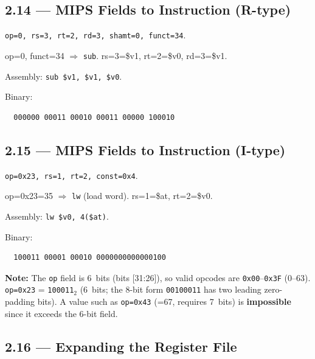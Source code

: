 \subsection*{2.14 --- MIPS Fields to Instruction (R-type)}
\hypertarget{sol-2.14}{}

\texttt{op=0, rs=3, rt=2, rd=3, shamt=0, funct=34}.

op=0, funct=34 $\Rightarrow$ \texttt{sub}.
rs=3=\$v1, rt=2=\$v0, rd=3=\$v1.

Assembly: \texttt{sub \$v1, \$v1, \$v0}.

Binary:
\begin{verbatim}
  000000 00011 00010 00011 00000 100010
\end{verbatim}

\subsection*{2.15 --- MIPS Fields to Instruction (I-type)}
\hypertarget{sol-2.15}{}

\texttt{op=0x23, rs=1, rt=2, const=0x4}.

op=0x23=35 $\Rightarrow$ \texttt{lw} (load word).
rs=1=\$at, rt=2=\$v0.

Assembly: \texttt{lw \$v0, 4(\$at)}.

Binary:
\begin{verbatim}
  100011 00001 00010 0000000000000100
\end{verbatim}

\begin{flushright}
\begin{minipage}{0.92\linewidth}
\scriptsize
\textbf{Note:}\quad
The \texttt{op} field is 6~bits (bits [31:26]), so valid opcodes
are \texttt{0x00}--\texttt{0x3F} (0--63).
\texttt{op=0x23} = \texttt{100011}$_{2}$ (6~bits; the 8-bit form
\texttt{00100011} has two leading zero-padding bits).
A value such as \texttt{op=0x43} (=67, requires 7~bits) is
\textbf{impossible} since it exceeds the 6-bit field.
\end{minipage}
\end{flushright}

\subsection*{2.16 --- Expanding the Register File}
\hypertarget{sol-2.16}{}

